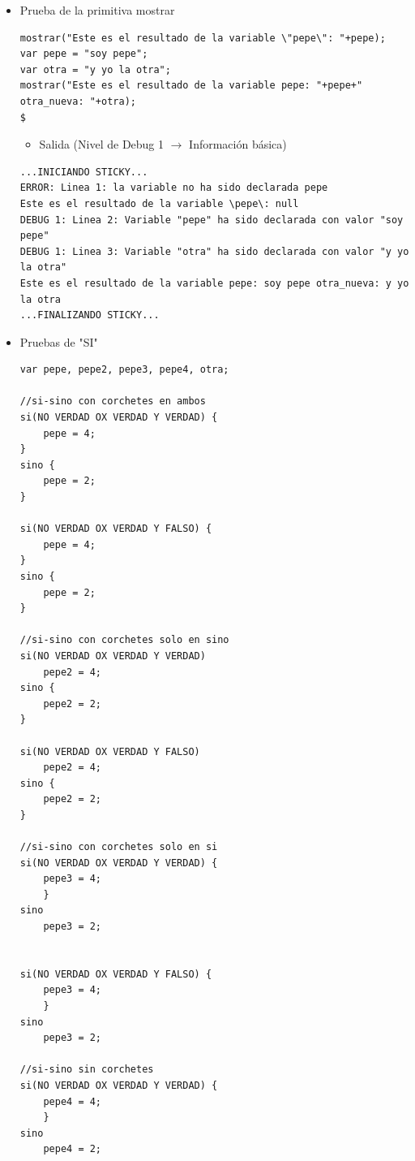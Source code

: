 \documentclass[a4paper, 12pt]{book}
\begin{document}
\begin{itemize}
\item Prueba de la primitiva mostrar\\
  

  
\begin{verbatim}
mostrar("Este es el resultado de la variable \"pepe\": "+pepe);
var pepe = "soy pepe";
var otra = "y yo la otra";
mostrar("Este es el resultado de la variable pepe: "+pepe+" otra_nueva: "+otra);
$
\end{verbatim}
  
  
  
  \begin{itemize}
  \item Salida (Nivel de Debug 1 $\rightarrow$ Información básica)
  \end{itemize}
\begin{verbatim}
...INICIANDO STICKY...
ERROR: Linea 1: la variable no ha sido declarada pepe
Este es el resultado de la variable \pepe\: null
DEBUG 1: Linea 2: Variable "pepe" ha sido declarada con valor "soy pepe"
DEBUG 1: Linea 3: Variable "otra" ha sido declarada con valor "y yo la otra"
Este es el resultado de la variable pepe: soy pepe otra_nueva: y yo la otra
...FINALIZANDO STICKY...
\end{verbatim}
  
  
  
  
\item Pruebas de "SI"\\
  

  
\begin{verbatim}
var pepe, pepe2, pepe3, pepe4, otra;

//si-sino con corchetes en ambos
si(NO VERDAD OX VERDAD Y VERDAD) {
    pepe = 4;
}
sino {
    pepe = 2;
}

si(NO VERDAD OX VERDAD Y FALSO) {
    pepe = 4;
}
sino {
    pepe = 2;
}

//si-sino con corchetes solo en sino
si(NO VERDAD OX VERDAD Y VERDAD) 
    pepe2 = 4;
sino {
    pepe2 = 2;
}

si(NO VERDAD OX VERDAD Y FALSO) 
    pepe2 = 4;
sino {
    pepe2 = 2;
}

//si-sino con corchetes solo en si
si(NO VERDAD OX VERDAD Y VERDAD) {
    pepe3 = 4;
    }
sino 
    pepe3 = 2;


si(NO VERDAD OX VERDAD Y FALSO) {
    pepe3 = 4;
    }
sino 
    pepe3 = 2;

//si-sino sin corchetes
si(NO VERDAD OX VERDAD Y VERDAD) {
    pepe4 = 4;
    }
sino 
    pepe4 = 2;



\end{verbatim}
\end{itemize}
\end{document}
